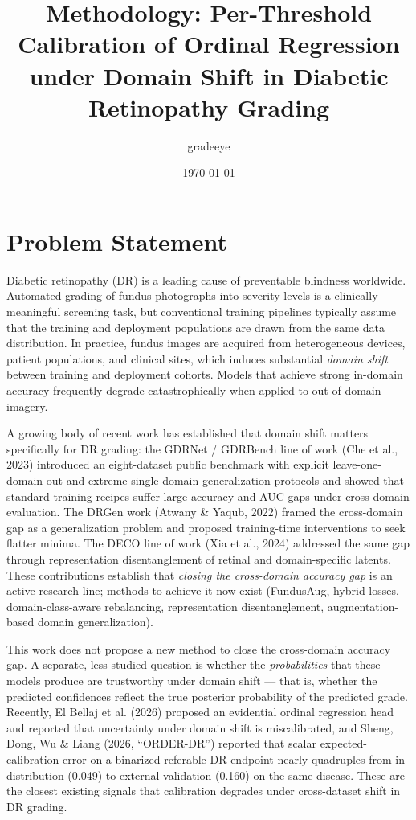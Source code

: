 \documentclass[11pt]{article}
\title{Methodology: Per-Threshold Calibration of Ordinal Regression under Domain Shift in Diabetic Retinopathy Grading}
\author{gradeeye}
\date{\today}
\begin{document}
\maketitle

\section{Problem Statement}
Diabetic retinopathy (DR) is a leading cause of preventable blindness worldwide. Automated grading of fundus photographs into severity levels is a clinically meaningful screening task, but conventional training pipelines typically assume that the training and deployment populations are drawn from the same data distribution. In practice, fundus images are acquired from heterogeneous devices, patient populations, and clinical sites, which induces substantial \emph{domain shift} between training and deployment cohorts. Models that achieve strong in-domain accuracy frequently degrade catastrophically when applied to out-of-domain imagery.

A growing body of recent work has established that domain shift matters specifically for DR grading: the GDRNet / GDRBench line of work (Che et al., 2023) introduced an eight-dataset public benchmark with explicit leave-one-domain-out and extreme single-domain-generalization protocols and showed that standard training recipes suffer large accuracy and AUC gaps under cross-domain evaluation. The DRGen work (Atwany \& Yaqub, 2022) framed the cross-domain gap as a generalization problem and proposed training-time interventions to seek flatter minima. The DECO line of work (Xia et al., 2024) addressed the same gap through representation disentanglement of retinal and domain-specific latents. These contributions establish that \emph{closing the cross-domain accuracy gap} is an active research line; methods to achieve it now exist (FundusAug, hybrid losses, domain-class-aware rebalancing, representation disentanglement, augmentation-based domain generalization).

This work does not propose a new method to close the cross-domain accuracy gap. A separate, less-studied question is whether the \emph{probabilities} that these models produce are trustworthy under domain shift --- that is, whether the predicted confidences reflect the true posterior probability of the predicted grade. Recently, El Bellaj et al. (2026) proposed an evidential ordinal regression head and reported that uncertainty under domain shift is miscalibrated, and Sheng, Dong, Wu \& Liang (2026, ``ORDER-DR'') reported that scalar expected-calibration error on a binarized referable-DR endpoint nearly quadruples from in-distribution (0.049) to external validation (0.160) on the same disease. These are the closest existing signals that calibration degrades under cross-dataset shift in DR grading.
\end{document}
